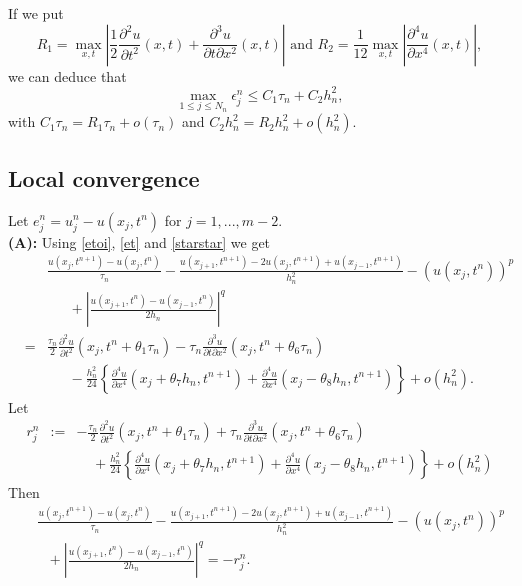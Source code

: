 \documentclass[a4paper,12pt,english,reqno]{smfart}
\begin{document}
	If we put
	\begin{equation*}
	R_{1}=\max_{x,t}\left|\frac{1}{2}\frac{\partial^{2} u}{\partial t^{2}}(x,t)+\frac{\partial^{3} u}{\partial t \partial x^{2}}(x,t)\right| \text{ and } 
	R_{2}=\frac{1}{12}\max_{x,t}\left|\frac{\partial^{4} u}{\partial x^{4}}(x,t)\right|,
	\end{equation*}
	we can deduce that 
	\begin{equation*}
	\max_{1\leq j \leq N_{n}}\epsilon_{j}^{n}\leq C_{1}\tau_{n}+C_{2}h_{n}^{2},
	\end{equation*}
	with $C_{1}\tau_{n}=R_{1}\tau_{n}+o(\tau_{n})$ and $C_{2}h_{n}^{2}=R_{2}h_{n}^{2}+o(h_{n}^{2}).$
	\subsection{Local convergence} 
	Let $e_{j}^{n}=u_{j}^{n}-u(x_{j},t^{n})$ for $j=1,...,m-2.$\\
	\textbf{(A):} Using \eqref{etoi}, \eqref{et} and \ref{starstar} we get
	\begin{eqnarray*}
		&&\frac{u(x_{j},t^{n+1})-u(x_{j},t^{n})}{\tau_{n}}-\frac{u(x_{j+1},t^{n+1})-2u(x_{j},t^{n+1})+u(x_{j-1},t^{n+1})}{h_{n}^{2}}
		-\left(u(x_{j},t^{n})\right)^{p}\\
		&&\ \ \ \ \ \ \  +\left|\frac{u(x_{j+1},t^{n})-u(x_{j-1},t^{n})}{2h_{n}}\right|^{q}\\
		&=&\frac{\tau_{n}}{2}\frac{\partial^{2}u}{\partial t^{2}}(x_{j},t^{n}+\theta_{1}\tau_{n})-\tau_{n}\frac{\partial^{3} u}{\partial t \partial x^{2}}(x_{j},t^{n}+\theta_{6}\tau_{n})\\
		&&\ \ \ \ \ \ \ -\frac{h_{n}^{2}}{24}\left\{\frac{\partial^{4}u}{\partial x^{4}}(x_{j}+\theta_{7}h_{n},t^{n+1})+\frac{\partial^{4}u}{\partial x^{4}}(x_{j}-\theta_{8}h_{n},t^{n+1})\right\}+o(h_{n}^{2}).
	\end{eqnarray*}
	Let 
	\begin{eqnarray*}
		r_{j}^{n}&:=&-\frac{\tau_{n}}{2}\frac{\partial^{2}u}{\partial t^{2}}(x_{j},t^{n}+\theta_{1}\tau_{n})+\tau_{n}\frac{\partial^{3} u}{\partial t \partial x^{2}}(x_{j},t^{n}+\theta_{6}\tau_{n})\\
		&&\ \ \ \ \ +\frac{h_{n}^{2}}{24}\left\{\frac{\partial^{4}u}{\partial x^{4}}(x_{j}+\theta_{7}h_{n},t^{n+1})+\frac{\partial^{4}u}{\partial x^{4}}(x_{j}-\theta_{8}h_{n},t^{n+1})\right\}+o(h_{n}^{2})
	\end{eqnarray*}
	Then 	
	\begin{eqnarray}
	&&\frac{u(x_{j},t^{n+1})-u(x_{j},t^{n})}{\tau_{n}}-\frac{u(x_{j+1},t^{n+1})-2u(x_{j},t^{n+1})+u(x_{j-1},t^{n+1})}{h_{n}^{2}}-\left(u(x_{j},t^{n})\right)^{p} \nonumber \\
	&&\ \ \ +\left|\frac{u(x_{j+1},t^{n})-u(x_{j-1},t^{n})}{2h_{n}}\right|^{q}=-r_{j}^{n}.
	\label{C}
	\end{eqnarray}
\end{document}
